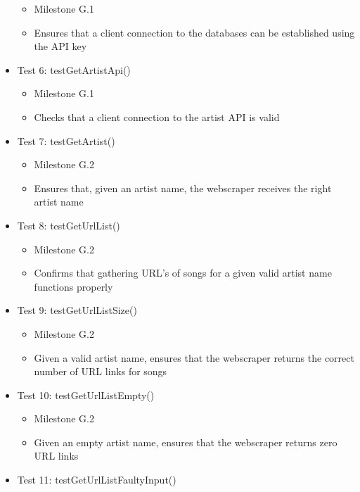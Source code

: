 \documentclass[]{article}
\begin{document}
\begin{itemize}
  \begin{itemize}
  \itemsep1pt\parskip0pt
  \item
    Milestone G.1
  \item
    Ensures that a client connection to the databases can be established
    using the API key
  \end{itemize}
\item
  Test 6: testGetArtistApi()

  \begin{itemize}
  \itemsep1pt\parskip0pt
  \item
    Milestone G.1
  \item
    Checks that a client connection to the artist API is valid
  \end{itemize}
\item
  Test 7: testGetArtist()

  \begin{itemize}
  \itemsep1pt\parskip0pt
  \item
    Milestone G.2
  \item
    Ensures that, given an artist name, the webscraper receives the
    right artist name
  \end{itemize}
\item
  Test 8: testGetUrlList()

  \begin{itemize}
  \itemsep1pt\parskip0pt
  \item
    Milestone G.2
  \item
    Confirms that gathering URL's of songs for a given valid artist name
    functions properly
  \end{itemize}
\item
  Test 9: testGetUrlListSize()

  \begin{itemize}
  \itemsep1pt\parskip0pt
  \item
    Milestone G.2
  \item
    Given a valid artist name, ensures that the webscraper returns the
    correct number of URL links for songs
  \end{itemize}
\item
  Test 10: testGetUrlListEmpty()

  \begin{itemize}
  \itemsep1pt\parskip0pt
  \item
    Milestone G.2
  \item
    Given an empty artist name, ensures that the webscraper returns zero
    URL links
  \end{itemize}
\item
  Test 11: testGetUrlListFaultyInput()


\end{itemize}
\end{document}

